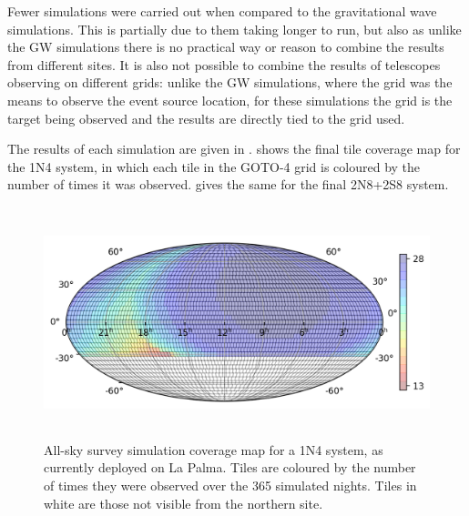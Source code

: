 \begin{colsection}
\begin{colsection}
Fewer simulations were carried out when compared to the gravitational wave simulations. This is partially due to them taking longer to run, but also as unlike the GW simulations there is no practical way or reason to combine the results from different sites. It is also not possible to combine the results of telescopes observing on different grids: unlike the GW simulations, where the grid was the means to observe the event source location, for these simulations the grid is the target being observed and the results are directly tied to the grid used.

The results of each simulation are given in .  shows the final tile coverage map for the 1N4 system, in which each tile in the GOTO-4 grid is coloured by the number of times it was observed.  gives the same for the final 2N8+2S8 system.


\begin{figure}[p]
    \begin{center}
        \includegraphics[height=190pt]{images/survey_sims/365_1N4_lite.png}
    \end{center}
    \caption[All-sky survey simulation results: 1N4 system]{
        All-sky survey simulation coverage map for a 1N4 system, as currently deployed on La Palma. Tiles are coloured by the number of times they were observed over the 365 simulated nights. Tiles in white are those not visible from the northern site.
    }\label{fig:survey_sim_1n4}
\end{figure}


\end{colsection}
\end{colsection}
